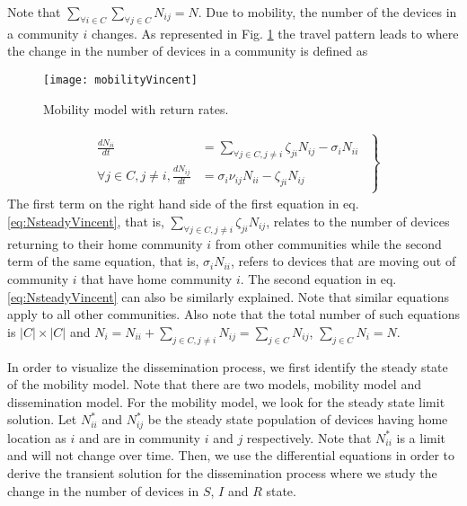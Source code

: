 \documentclass[review]{elsarticle}
\begin{document}
Note that $\displaystyle \sum_{\forall i\in C}\sum_{\forall j\in C}N_{ij}=N$. Due to mobility, the number of the devices in a community $i$ changes. As represented in Fig. \ref{fig:mobilityVincent} the travel pattern leads to \cite{Sattenspiel1995} where the change in the number of devices in a community is defined as
\begin{figure}\centering
    \texttt{[image: mobilityVincent]}
    \caption{Mobility model with return rates.}
    \label{fig:mobilityVincent}
\end{figure}

\begin{eqnarray}\label{eq:NsteadyVincent}
    \left.\begin{matrix}\begin{aligned}
        \frac{dN_{ii}}{dt} &= \sum_{\forall j\in C, j\neq i} \zeta_{ji} N_{ij} - \sigma_{i}N_{ii}\\
        \forall j\in C, j\neq i, \frac{dN_{ij}}{dt} &= \sigma_{i}\nu_{ij} N_{ii} - \zeta_{ji} N_{ij}
    \end{aligned}\end{matrix}\right\}
\end{eqnarray}
The first term on the right hand side of the first equation in eq. \ref{eq:NsteadyVincent}, that is, $\displaystyle \sum_{\forall j\in C, j\neq i} \zeta_{ji} N_{ij}$, relates to the number of devices returning to their home community $i$ from other communities while the second term of the same equation, that is, $\sigma_{i}N_{ii}$, refers to devices that are moving out of community $i$ that have home community $i$. The second equation in eq. \ref{eq:NsteadyVincent} can also be similarly explained. Note that similar equations apply to all other communities. Also note that the total number of such equations is $|C| \times |C|$ and $\displaystyle N_i=N_{ii}+\sum_{j\in C,j\neq i}N_{ij}=\sum_{j\in C}N_{ij}$, $\displaystyle \sum_{j\in C}N_{i}=N$.

In order to visualize the dissemination process, we first identify the steady state of the mobility model. Note that there are two models, mobility model and dissemination model. For the mobility model, we look for the steady state limit solution. Let $N_{ii}^*$ and $N_{ij}^*$ be the steady state population of devices having home location as $i$ and are in community $i$ and $j$ respectively. Note that $N_{ii}^*$ is a limit and will not change over time. Then, we use the differential equations in order to derive the transient solution for the dissemination process where we study the change in the number of devices in $S$, $I$ and $R$ state.
\end{document}
